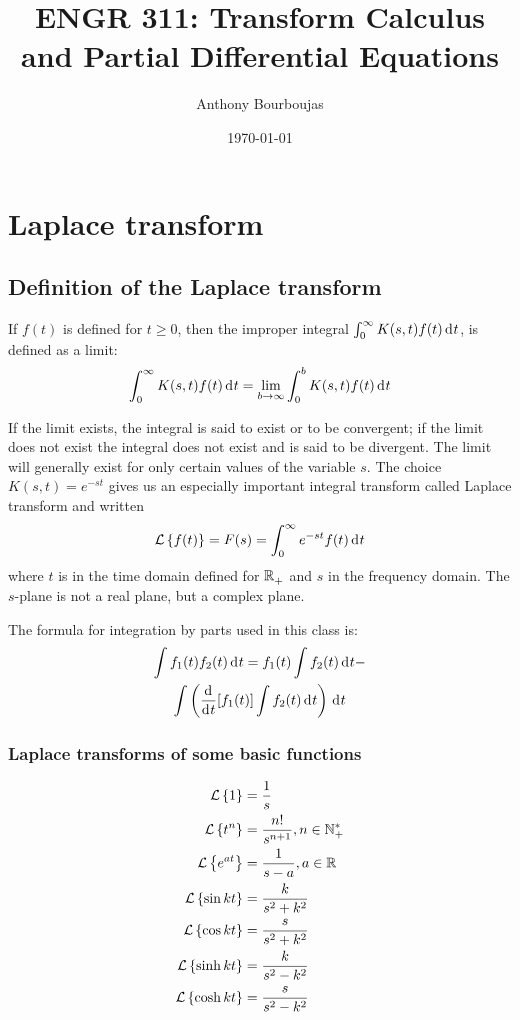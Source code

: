 \documentclass[10pt, twocolumn]{article}
\title{ENGR 311: Transform Calculus and Partial Differential Equations}
\date{\today}
\author{Anthony Bourboujas}
\begin{document}
\maketitle %
\section{Laplace transform}
\subsection{Definition of the Laplace transform}
If \(f(t)\) is defined for \(t \geqslant 0\), then the improper integral \(\int_0^\infty{K(s, t) f(t) \,\mathrm{d}^{} t}\), is defined as a limit:
\[
  \int_0^\infty{K(s, t) f(t) \,\mathrm{d}^{} t} = \lim_{b \to \infty}{\int_0^b{K(s, t) f(t) \,\mathrm{d}^{} t}}
\]

If the limit exists, the integral is said to exist or to be convergent; if the limit does not exist the integral does not exist and is said to be divergent.
The limit will generally exist for only certain values of the variable \(s\).
The choice \(K(s, t) = e^{-st}\) gives us an especially important integral transform called Laplace transform and written
\[
  \mathcal{L}\left\{ f(t) \right\} = F(s) = \int_0^\infty{e^{-st} f(t) \,\mathrm{d}^{} t}
\]
where \(t\) is in the time domain defined for \(\mathbb{R}_{+}^{}\) and \(s\) in the frequency domain.
The \(s\)-plane is not a real plane, but a complex plane.

The formula for integration by parts used in this class is:
\begin{multline*}
  \int{f_1(t) f_2(t) \,\mathrm{d}^{} t} = f_1(t) \int{f_2(t) \,\mathrm{d}^{} t} - \\
  \int{ \left( \frac{\mathrm{d}^{} }{\mathrm{d}^{} t} [f_1(t)] \int{f_2(t) \,\mathrm{d}^{} t} \right) \,\mathrm{d}^{} t}
\end{multline*}


\subsubsection{Laplace transforms of some basic functions}
\begin{align*}
  \mathcal{L}\left\{ 1 \right\}         & = \frac{1}{s}                               \\
  \mathcal{L}\left\{ t^n \right\}       & = \frac{n!}{s^{n + 1}}, n \in \mathbb{N}_{+}^{*} \\
  \mathcal{L}\left\{ e^{at} \right\}    & = \frac{1}{s - a}, a \in \mathbb{R}_{}^{}        \\
  \mathcal{L}\left\{ \sin{kt} \right\}  & = \frac{k}{s^2 + k^2}                       \\
  \mathcal{L}\left\{ \cos{kt} \right\}  & = \frac{s}{s^2 + k^2}                       \\
  \mathcal{L}\left\{ \sinh{kt} \right\} & = \frac{k}{s^2 - k^2}                       \\
  \mathcal{L}\left\{ \cosh{kt} \right\} & = \frac{s}{s^2 - k^2}                       \\
\end{align*}
\end{document}
